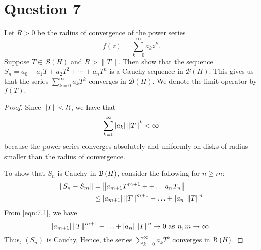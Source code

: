 \section{Question 7}
\horz

 Let $R >0$ be the radius of convergence of the power series $$f(z)= \sum\limits_{k=0}^{\infty} a_k z^k.$$  
Suppose $T\in \mathcal B(H)$ and $R > \|T\|.$ Then show that the sequence $S_n= a_0+a_1T + a_2T^2+\cdots+a_n T^n$ is a Cauchy sequence in $\mathcal B(H).$ This gives us that the series $\sum\limits_{k=0}^{\infty} a_k T^k$ converges in $\mathcal B(H).$ We denote the limit operator by $f(T).$

\horz

\begin{proof}
    Since $\left\lVert T \right\rVert < R$, we have that
    \begin{equation}
	\sum_{k=0}^{\infty} \left\lvert a_{k} \right\rvert \left\lVert T \right\rVert^{k} < \infty
	\label{eqn:7.1}
    \end{equation}
    because the power series converges absolutely and uniformly on disks of radius smaller than the radius of convergence.

    To show that $S_{n}$ is Cauchy in ${\cal B} \left( H \right)$, consider the following for $n\ge m$:
    \begin{align*}
	\left\lVert S_n - S_{m} \right\rVert &= \left\lVert a_{m+1}T^{m+1}+ +\ldots a_{n}T_{n} \right\rVert \\
	&\le \left\lvert a_{m+1} \right\rvert\left\lVert T \right\rVert^{m+1} + \ldots + \left\lvert a_{n} \right\rvert \left\lVert T \right\rVert^{n}
    \end{align*}
    From \ref{eqn:7.1}, we have 
    \begin{equation*}
	\left\lvert a_{m+1} \right\rvert\left\lVert T \right\rVert^{m+1} + \ldots + \left\lvert a_{n} \right\rvert \left\lVert T \right\rVert^{n} \to 0 \text{ as } n,m \to \infty.
    \end{equation*}
    Thus, $\left( S_{n} \right)$ is Cauchy, Hence, the series $\sum_{k=0}^{\infty} a_{k} T^{k}$ converges in ${\cal B} \left( H \right)$. 
\end{proof}
